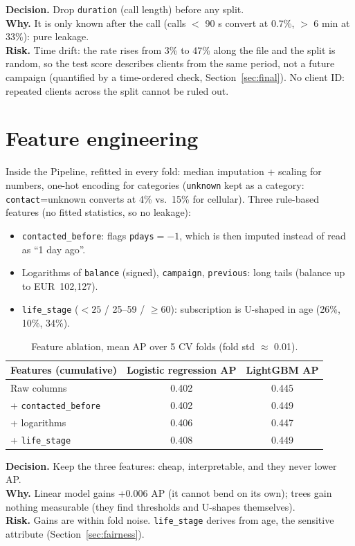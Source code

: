 \documentclass[11pt,a4paper]{article}
\newcommand{\eur}[1]{EUR~#1}
\newcommand{\dwr}[3]{\par\smallskip\noindent\colorbox{gray!10}{\parbox{\dimexpr\linewidth-2\fboxsep}{\small
\textbf{Decision.} #1\\ \textbf{Why.} #2\\ \textbf{Risk.} #3}}\par\smallskip}
\begin{document}
\dwr{Drop \texttt{duration} (call length) before any split.}
{It is only known after the call (calls $<$ 90 s convert at 0.7\%, $>$ 6 min at 33\%): pure leakage.}
{Time drift: the rate rises from 3\% to 47\% along the file and the split is random, so the test
score describes clients from the same period, not a future campaign (quantified by a time-ordered
check, Section~\ref{sec:final}). No client ID: repeated clients across the split cannot be ruled out.}

\section{Feature engineering}

Inside the Pipeline, refitted in every fold: median imputation + scaling for numbers, one-hot encoding
for categories (\texttt{unknown} kept as a category: \texttt{contact}=unknown converts at 4\% vs.\ 15\%
for cellular). Three rule-based features (no fitted statistics, so no leakage):
\begin{itemize}
  \item \texttt{contacted\_before}: flags \texttt{pdays}$=-1$, which is then imputed instead of read
  as ``1 day ago''.
  \item Logarithms of \texttt{balance} (signed), \texttt{campaign}, \texttt{previous}: long tails
  (balance up to \eur{102,127}).
  \item \texttt{life\_stage} ($<25$ / 25--59 / $\geq 60$): subscription is U-shaped in age (26\%, 10\%, 34\%).
\end{itemize}

\begin{table}[H]
\centering\small
\begin{tabular}{lcc}
\toprule
Features (cumulative) & Logistic regression AP & LightGBM AP \\
\midrule
Raw columns & 0.402 & 0.445 \\
+ \texttt{contacted\_before} & 0.402 & 0.449 \\
+ logarithms & 0.406 & 0.447 \\
+ \texttt{life\_stage} & 0.408 & 0.449 \\
\bottomrule
\end{tabular}
\caption{Feature ablation, mean AP over 5 CV folds (fold std $\approx$ 0.01).}
\label{tab:ablation}
\end{table}

\dwr{Keep the three features: cheap, interpretable, and they never lower AP.}
{Linear model gains +0.006 AP (it cannot bend on its own); trees gain nothing measurable (they find
thresholds and U-shapes themselves).}
{Gains are within fold noise. \texttt{life\_stage} derives from age, the sensitive attribute (Section~\ref{sec:fairness}).}
\end{document}
